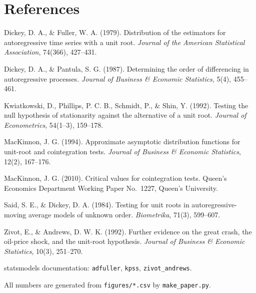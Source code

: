 \documentclass[11pt,a4paper]{article}
\begin{document}
\section*{References}
{\small
\setlength{\parskip}{2pt}
\hangindent=1.27cm Dickey, D. A., \& Fuller, W. A. (1979). Distribution of the estimators for autoregressive time series with a unit root.
\textit{Journal of the American Statistical Association}, 74(366), 427--431.\par
\hangindent=1.27cm Dickey, D. A., \& Pantula, S. G. (1987). Determining the order of differencing in autoregressive processes. \textit{Journal of
Business \& Economic Statistics}, 5(4), 455--461.\par
\hangindent=1.27cm Kwiatkowski, D., Phillips, P. C. B., Schmidt, P., \& Shin, Y. (1992). Testing the null hypothesis of stationarity against the
alternative of a unit root. \textit{Journal of Econometrics}, 54(1--3), 159--178.\par
\hangindent=1.27cm MacKinnon, J. G. (1994). Approximate asymptotic distribution functions for unit-root and cointegration tests. \textit{Journal
of Business \& Economic Statistics}, 12(2), 167--176.\par
\hangindent=1.27cm MacKinnon, J. G. (2010). Critical values for cointegration tests. Queen's Economics Department Working Paper No.~1227, Queen's
University.\par
\hangindent=1.27cm Said, S. E., \& Dickey, D. A. (1984). Testing for unit roots in autoregressive-moving average models of unknown order.
\textit{Biometrika}, 71(3), 599--607.\par
\hangindent=1.27cm Zivot, E., \& Andrews, D. W. K. (1992). Further evidence on the great crash, the oil-price shock, and the unit-root hypothesis.
\textit{Journal of Business \& Economic Statistics}, 10(3), 251--270.\par
\hangindent=1.27cm statsmodels documentation: \texttt{adfuller}, \texttt{kpss}, \texttt{zivot\_andrews}.\par

\smallskip
All numbers are generated from
\texttt{figures/*.csv} by \texttt{make\_paper.py}.
}
\end{document}
